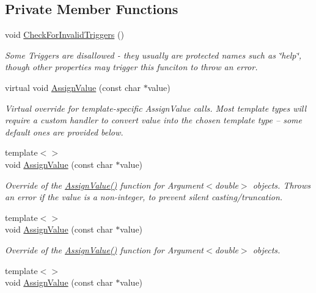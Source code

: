 \subsection*{Private Member Functions}
\begin{DoxyCompactItemize}
\item 
void \hyperlink{classJSL_1_1Argument_a8614eb66f807132c4323847e05e666c4}{Check\+For\+Invalid\+Triggers} ()
\begin{DoxyCompactList}\small\item\em Some Triggers are disallowed -\/ they usually are protected names such as \char`\"{}help\char`\"{}, though other properties may trigger this funciton to throw an error. \end{DoxyCompactList}\item 
virtual void \hyperlink{classJSL_1_1Argument_ac77530598054943c996dbb5fb677b844}{Assign\+Value} (const char $\ast$value)
\begin{DoxyCompactList}\small\item\em Virtual override for template-\/specific Assign\+Value calls. Most template types will require a custom handler to convert value into the chosen template type -- some default ones are provided below. \end{DoxyCompactList}\item 
{\footnotesize template$<$$>$ }\\void \hyperlink{classJSL_1_1Argument_a6e8fe8e7cca2aeffe23f6fbadb88d4c8}{Assign\+Value} (const char $\ast$value)
\begin{DoxyCompactList}\small\item\em Override of the \hyperlink{classJSL_1_1Argument_ac77530598054943c996dbb5fb677b844}{Assign\+Value()} function for Argument$<$double$>$ objects. Throws an error if the value is a non-\/integer, to prevent silent casting/truncation. \end{DoxyCompactList}\item 
{\footnotesize template$<$$>$ }\\void \hyperlink{classJSL_1_1Argument_a059e7c6f1d9232a93cf725510fe2db27}{Assign\+Value} (const char $\ast$value)
\begin{DoxyCompactList}\small\item\em Override of the \hyperlink{classJSL_1_1Argument_ac77530598054943c996dbb5fb677b844}{Assign\+Value()} function for Argument$<$double$>$ objects. \end{DoxyCompactList}\item 
{\footnotesize template$<$$>$ }\\void \hyperlink{classJSL_1_1Argument_af5ccee16ba3403ef62d4bec9d380c762}{Assign\+Value} (const char $\ast$value)

\end{DoxyCompactItemize}
